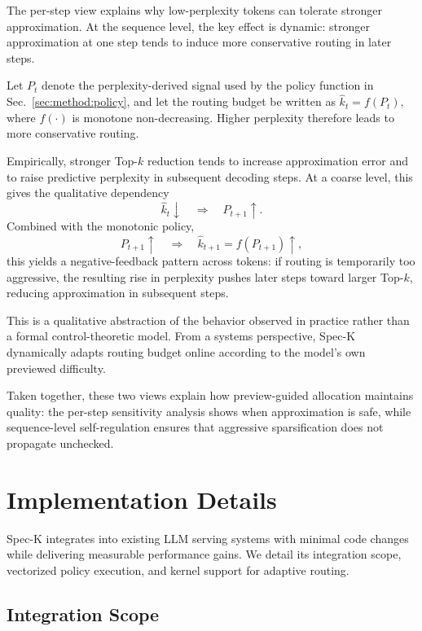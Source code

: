 \documentclass[conference]{IEEEtran}
\theoremstyle{definition} %
\begin{document}
The per-step view explains why low-perplexity tokens can tolerate stronger approximation.
At the sequence level, the key effect is dynamic: stronger approximation at one step tends to induce more conservative routing in later steps.

Let $P_t$ denote the perplexity-derived signal used by the policy function in Sec.~\ref{sec:method:policy}, and let the routing budget be written as
$
\hat{k}_t = f(P_t),
$
where $f(\cdot)$ is monotone non-decreasing.
Higher perplexity therefore leads to more conservative routing.

Empirically, stronger Top-$k$ reduction tends to increase approximation error and to raise predictive perplexity in subsequent decoding steps.
At a coarse level, this gives the qualitative dependency
\begin{equation}
\hat{k}_t \downarrow \quad \Longrightarrow \quad P_{t+1} \uparrow.
\end{equation}
Combined with the monotonic policy,
\begin{equation}
P_{t+1} \uparrow \quad \Longrightarrow \quad \hat{k}_{t+1} = f(P_{t+1}) \uparrow,
\end{equation}
this yields a negative-feedback pattern across tokens:
if routing is temporarily too aggressive, the resulting rise in perplexity pushes later steps toward larger Top-$k$, reducing approximation in subsequent steps.

This is a qualitative abstraction of the behavior observed in practice rather than a formal control-theoretic model. From a systems perspective, Spec-K dynamically adapts routing budget online according to the model's own previewed difficulty.

Taken together, these two views explain how preview-guided allocation maintains 
quality: the per-step sensitivity analysis shows when approximation is safe, while 
sequence-level self-regulation ensures that aggressive sparsification does not 
propagate unchecked.

\section{Implementation Details}

Spec-K integrates into existing LLM serving systems with minimal code changes while delivering measurable performance gains. We detail its integration scope, vectorized policy execution, and kernel support for adaptive routing.

\subsection{Integration Scope}
\end{document}
